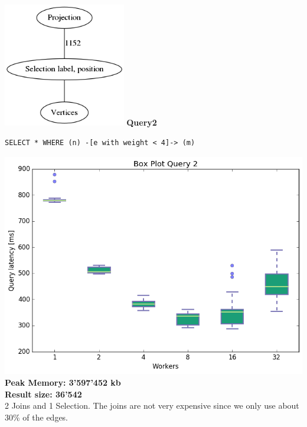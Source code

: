 \documentclass[11pt,singlecolumn]{scrartcl}
\begin{document}
\includegraphics[width=0.4\textwidth]{graph1}
\clearpage
\textbf{Query2}\\
\begin{verbatim}
SELECT * WHERE (n) -[e with weight < 4]-> (m)\end{verbatim}
\includegraphics[width=1\textwidth]{box/q2}
\textbf{Peak Memory: 3'597'452 kb}\\
\textbf{Result size: 36'542}\\
2 Joins and 1 Selection. The joins are not very expensive since we only use about 30\% of the edges.
\clearpage
\end{document}
